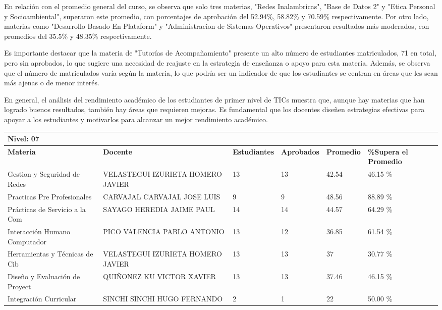 En relación con el promedio general del curso, se observa que solo tres materias, "Redes Inalambricas", "Base de Datos 2" y "Etica Personal y Socioambiental", superaron este promedio, con porcentajes de aprobación del 52.94\%, 58.82\% y 70.59\% respectivamente. Por otro lado, materias como "Desarrollo Basado En Plataform" y "Administracion de Sistemas Operativos" presentaron resultados más moderados, con promedios del 35.5\% y 48.35\% respectivamente.

Es importante destacar que la materia de "Tutorías de Acompañamiento" presente un alto número de estudiantes matriculados, 71 en total, pero sin aprobados, lo que sugiere una necesidad de reajuste en la estrategia de enseñanza o apoyo para esta materia. Además, se observa que el número de matriculados varía según la materia, lo que podría ser un indicador de que los estudiantes se centran en áreas que les sean más ajenas o de menor interés.

En general, el análisis del rendimiento académico de los estudiantes de primer nivel de TICs muestra que, aunque hay materias que han logrado buenos resultados, también hay áreas que requieren mejoras. Es fundamental que los docentes diseñen estrategias efectivas para apoyar a los estudiantes y motivarlos para alcanzar un mejor rendimiento académico.\\
\vspace{1cm}\small
\begin{tabularx}{\textwidth}{|p{2.5cm}|p{2.5cm}|X|X|X|X|}
\hline
\multicolumn{6}{|X|}{\textbf{Nivel: 07 }}\\\hline\textbf{Materia} & \textbf{Docente} & \textbf{Estudiantes} & \textbf{Aprobados} & \textbf{Promedio} & \textbf{\%Supera el Promedio} \\ \hline
Gestion y Seguridad de Redes & VELASTEGUI IZURIETA HOMERO JAVIER & 13 & 13 & 42.54 & 46.15 \%\\ \hline
Practicas Pre Profesionales & CARVAJAL CARVAJAL JOSE LUIS & 9 & 9 & 48.56 & 88.89 \%\\ \hline
Prácticas de Servicio a la Com & SAYAGO HEREDIA JAIME PAUL & 14 & 14 & 44.57 & 64.29 \%\\ \hline
Interacción Humano Computador & PICO VALENCIA PABLO ANTONIO & 13 & 12 & 36.85 & 61.54 \%\\ \hline
Herramientas y Técnicas de Cib & VELASTEGUI IZURIETA HOMERO JAVIER & 13 & 13 & 37 & 30.77 \%\\ \hline
Diseño y Evaluación de Proyect & QUIÑONEZ KU VICTOR XAVIER & 13 & 13 & 37.46 & 46.15 \%\\ \hline
Integración Curricular & SINCHI SINCHI HUGO FERNANDO & 2 & 1 & 22 & 50.00 \%\\ \hline
\end{tabularx}

